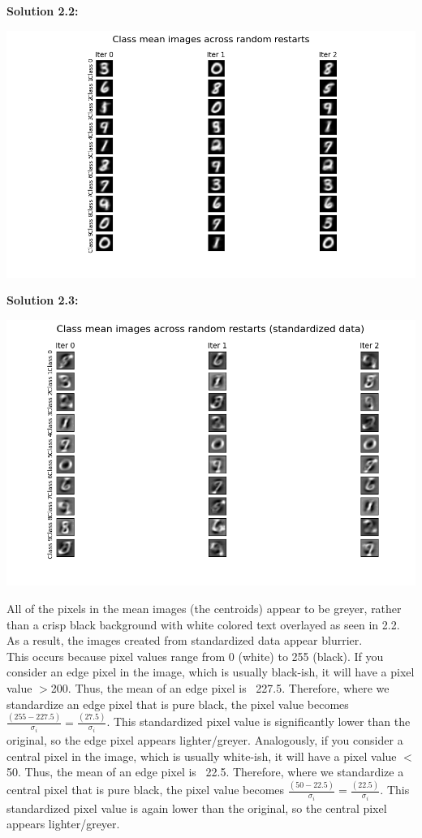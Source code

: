 \documentclass[submit]{harvardml}
\begin{document}
\noindent\textbf{Solution 2.2:}\\
\begin{center}
    \includegraphics[scale=0.6]{2.2.png}
\end{center}

\noindent\textbf{Solution 2.3:}\\
\begin{center}
    \includegraphics[scale=0.6]{2.3.png}
\end{center}
All of the pixels in the mean images (the centroids) appear to be greyer, rather than a crisp black background with white colored text overlayed as seen in 2.2. As a result, the images created from standardized data appear blurrier.\\

This occurs because pixel values range from 0 (white) to 255 (black). If you consider an edge pixel in the image, which is usually black-ish, it will have a pixel value $>$200. Thus, the mean of an edge pixel is ~227.5. Therefore, where we standardize an edge pixel that is pure black, the pixel value becomes $\frac{(255 - 227.5)}{\sigma_i} = \frac{(27.5)}{\sigma_i}$. This standardized pixel value is significantly lower than the original, so the edge pixel appears lighter/greyer. Analogously, if you consider a central pixel in the image, which is usually white-ish, it will have a pixel value $<$50. Thus, the mean of an edge pixel is ~22.5. Therefore, where we standardize a central pixel that is pure black, the pixel value becomes $\frac{(50 - 22.5)}{\sigma_i} = \frac{(22.5)}{\sigma_i}$. This standardized pixel value is again lower than the original, so the central pixel appears lighter/greyer.\\
\end{document}
